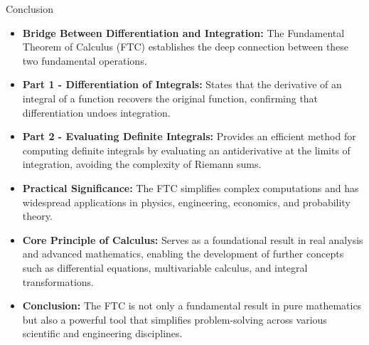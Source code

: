 \documentclass{beamer}
\begin{document}
\newpage






\begin{frame}{Conclusion}

    \begin{itemize}
        \footnotesize
        \item \textbf{Bridge Between Differentiation and Integration:} The Fundamental Theorem of Calculus (FTC) establishes the deep connection between these two fundamental operations.
        
        \item \textbf{Part 1 - Differentiation of Integrals:} States that the derivative of an integral of a function recovers the original function, confirming that differentiation undoes integration.
        
        \item \textbf{Part 2 - Evaluating Definite Integrals:} Provides an efficient method for computing definite integrals by evaluating an antiderivative at the limits of integration, avoiding the complexity of Riemann sums.
        
        \item \textbf{Practical Significance:} The FTC simplifies complex computations and has widespread applications in physics, engineering, economics, and probability theory.
    
        \item \textbf{Core Principle of Calculus:} Serves as a foundational result in real analysis and advanced mathematics, enabling the development of further concepts such as differential equations, multivariable calculus, and integral transformations.
    
        \item \textbf{Conclusion:} The FTC is not only a fundamental result in pure mathematics but also a powerful tool that simplifies problem-solving across various scientific and engineering disciplines.
    \end{itemize}
    
    \end{frame}
\end{document}
